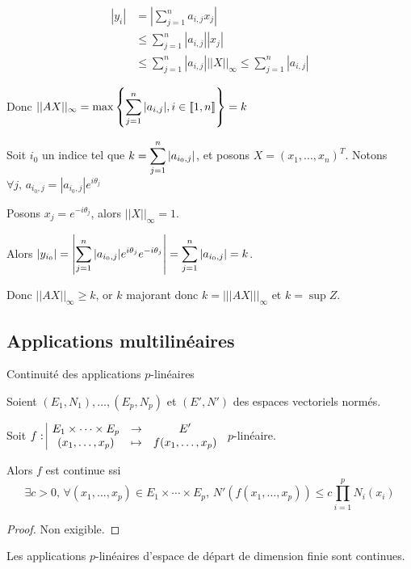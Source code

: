 \begin{align*}
    |y_i| & = \left| \sum_{j=1}^n a_{i, j} x_j \right| \\
    & \leqslant \sum_{j=1}^n |a_{i, j}| |x_j| \\
    & \leqslant \sum_{j=1}^n |a_{i, j}| ||X||_\infty \leqslant \sum_{j=1}^n |a_{i, j}|
\end{align*}

Donc $\displaystyle ||AX||_\infty = \max \left\{ \sum_{j = 1 }^{n } |a_{i, j}|, i \in [\![1, n]\!]  \right\} = k$

Soit $i_0$ un indice tel que $\displaystyle k = \sum_{j=1}^n |a_{i_0, j}|$, et posons 
$X = (x_1, \ldots, x_n)^T$. Notons $\forall j, \, a_{i_0, j} = |a_{i_0, j}| e^{i \theta_j}$ 

Posons $x_j = e^{-i \theta_j}$, alors $||X||_\infty = 1$.

Alors $\displaystyle |y_{i_0}| = \left|\sum_{j = 1 }^{n } | a_{i_0, j} | e^{i \theta_j} e^{-i \theta_j}\right| = \sum_{j=1}^n |a_{i_0, j}| = k$.

Donc $|| AX||_\infty \geqslant k$, or $k$ majorant donc $k = |||AX |||_\infty$ et $k = \sup Z$. 

\subsection{Applications multilinéaires}

\begin{theoreme}{Continuité des applications $p$-linéaires}{}

    Soient $(E_1, N_1), \ldots, (E_p, N_p)$ et $(E', N')$ des espaces vectoriels normés.
    
    Soit $f: \space \begin{array}{|ccc} \displaystyle E_1 \times \cdots \times E_p & \to & \displaystyle E' \\ \displaystyle (x_1, \ldots, x_p) & \mapsto & \displaystyle f(x_1, \ldots, x_p) \end{array}$ 
    $p$-linéaire. 

    \avspace Alors $f$ est continue ssi
    \[\exists c > 0, \, \forall (x_1, \ldots, x_p) \in E_1 \times \cdots \times E_p, \, N'(f(x_1, \ldots, x_p)) \leqslant c \prod_{i=1}^p N_i(x_i)\]
\end{theoreme}

\begin{proof}
    Non exigible.
\end{proof}

\begin{proposition}{}{}
    Les applications $p$-linéaires d'espace de départ de dimension finie sont continues.
\end{proposition}

